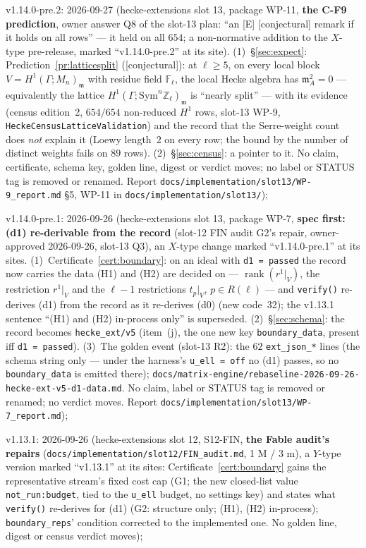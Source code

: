 \documentclass[11pt]{article}
\theoremstyle{remark}
\newcommand{\F}{\mathbb{F}}
\newcommand{\Z}{\mathbb{Z}}
\newcommand{\Sym}{\mathrm{Sym}}
\newcommand{\Ga}{\Gamma}
\newcommand{\Fl}{\F_\ell}
\DeclareMathOperator{\rank}{rank}
\newcommand{\m}{\mathfrak{m}}
\newcommand{\Mn}{M_n}
\newcommand{\CONJ}{\textsf{[conjectural]}}
\begin{document}
v1.14.0-pre.2: 2026-09-27 (hecke-extensions slot 13, package WP-11, \textbf{the C-F9
prediction}, owner answer Q8 of the slot-13 plan: ``an [E] \CONJ{} remark if it holds on all rows'' --- it held on
all $654$; a non-normative addition to the $X$-type pre-release, marked ``v1.14.0-pre.2'' at its site).
(1)~\S\ref{sec:expect}: Prediction~\ref{pr:latticesplit} (\CONJ): at $\ell\ge5$, on every local block $V=H^1(\Ga;\Mn)_\m$
with residue field $\Fl$, the local Hecke algebra has $\m_A^2=0$ --- equivalently the lattice
$H^1(\Ga;\Sym^n\Z_\ell)_\m$ is ``nearly split'' --- with its evidence (census edition~2, $654/654$ non-reduced
$H^1$ rows, slot-13 WP-9, \texttt{HeckeCensusLatticeValidation}) and the record that the Serre-weight count
does \emph{not} explain it (Loewy length~$2$ on every row; the bound by the number of distinct weights fails on
$89$ rows). (2)~\S\ref{sec:census}: a pointer to it. No claim, certificate, schema key, golden line, digest or
verdict moves; no label or STATUS tag is removed or renamed. Report
\texttt{docs/implementation/slot13/WP-9\_report.md} \S5, WP-11 in \texttt{docs/implementation/slot13/});

v1.14.0-pre.1: 2026-09-26 (hecke-extensions slot 13, package WP-7, \textbf{spec first:
(d1) re-derivable from the record} (slot-12 FIN audit G2's repair, owner-approved 2026-09-26, slot-13 Q3), an
$X$-type change marked ``v1.14.0-pre.1'' at its sites. (1)~Certificate~\ref{cert:boundary}: on an ideal with
\texttt{d1 = passed} the record now carries the data (H1) and (H2) are decided on --- $\rank(r^1|_V)$, the
restriction $r^1|_V$ and the $\ell-1$ restrictions $t_p|_V$, $p\in R(\ell)$ --- and \texttt{verify()} re-derives
(d1) from the record as it re-derives (d0) (new code~32); the v1.13.1 sentence ``(H1) and (H2) in-process
only'' is superseded. (2)~\S\ref{sec:schema}: the record becomes \texttt{hecke\_ext/v5} (item~(j), the one
new key \texttt{boundary\_data}, present iff \texttt{d1 = passed}). (3)~The golden event (slot-13 R2): the
$62$ \texttt{ext\_json\_*} lines (the schema string only --- under the harness's \texttt{u\_ell = off} no (d1)
passes, so no \texttt{boundary\_data} is emitted there);
\texttt{docs/matrix-engine/rebaseline-2026-09-26-hecke-ext-v5-d1-data.md}. No claim, label or STATUS tag is
removed or renamed; no verdict moves. Report \texttt{docs/implementation/slot13/WP-7\_report.md});

v1.13.1: 2026-09-26 (hecke-extensions slot 12, S12-FIN, \textbf{the Fable audit's repairs}
(\texttt{docs/implementation/slot12/FIN\_audit.md}, 1 M / 3 m), a $Y$-type version marked ``v1.13.1''
at its sites: Certificate~\ref{cert:boundary} gains the representative stream's fixed cost cap (G1; the new
closed-list value \texttt{not\_run:budget}, tied to the \texttt{u\_ell} budget, no settings key) and states what
\texttt{verify()} re-derives for (d1) (G2: structure only; (H1), (H2) in-process); \texttt{boundary\_reps}'
condition corrected to the implemented one. No golden line, digest or census verdict moves);
\end{document}
